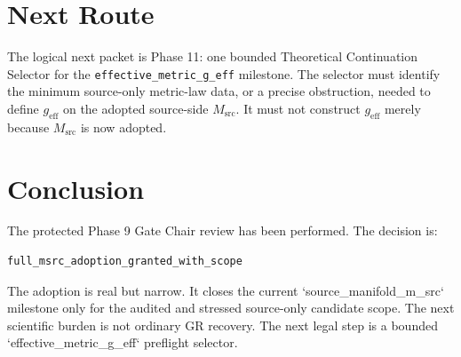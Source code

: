 \documentclass[11pt]{article}
\newcommand{\Msrc}{M_{\mathrm{src}}}
\newcommand{\geff}{g_{\mathrm{eff}}}
\begin{document}
\section{Next Route}

The logical next packet is Phase 11: one bounded Theoretical Continuation
Selector for the \texttt{effective\_metric\_g\_eff} milestone. The selector
must identify the minimum source-only metric-law data, or a precise
obstruction, needed to define \(\geff\) on the adopted source-side \(\Msrc\).
It must not construct \(\geff\) merely because \(\Msrc\) is now adopted.

\section{Conclusion}

The protected Phase 9 Gate Chair review has been performed. The decision is:

\begin{verbatim}
full_msrc_adoption_granted_with_scope
\end{verbatim}

The adoption is real but narrow. It closes the current `source_manifold_m_src`
milestone only for the audited and stressed source-only candidate scope. The
next scientific burden is not ordinary GR recovery. The next legal step is a
bounded `effective_metric_g_eff` preflight selector.
\end{document}
